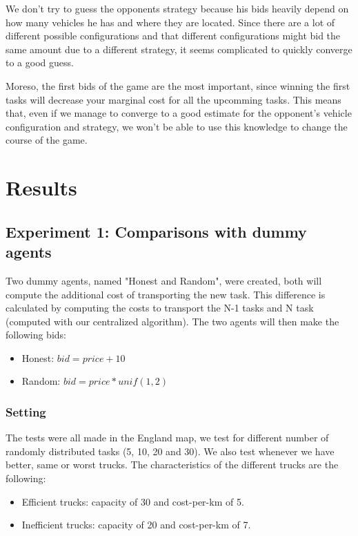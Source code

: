 \documentclass[11pt]{article}
\begin{document}
We don't try to guess the opponents strategy because his bids heavily depend on how many vehicles he has and where they are located. Since there are a lot of different possible configurations and that different configurations might bid the same amount due to a different strategy, it seems complicated to quickly converge to a good guess.

Moreso, the first bids of the game are the most important, since winning the first tasks will decrease your marginal cost for all the upcomming tasks. This means that, even if we manage to converge to a good estimate for the opponent's vehicle configuration and strategy, we won't be able to use this knowledge to change the course of the game.

\section{Results}

\subsection{Experiment 1: Comparisons with dummy agents}
Two dummy agents, named "Honest and Random", were created, both will compute the additional cost of transporting the new task. This difference is calculated by computing the costs to transport the N-1 tasks and N task (computed with our centralized algorithm). The two agents will then make the following bids:
\begin{itemize}
  \item Honest: $bid = price + 10$
  \item Random: $bid = price * unif(1,2)$
\end{itemize}

\subsubsection{Setting}
The tests were all made in the England map, we test for different number of randomly distributed tasks (5, 10, 20 and 30). We also test whenever we have better, same or worst trucks. 
The characteristics of the different trucks are the following:
\begin{itemize}
  \item Efficient trucks: capacity of 30 and cost-per-km of 5.
  \item Inefficient trucks: capacity of 20 and cost-per-km of 7.
\end{itemize}
\end{document}
